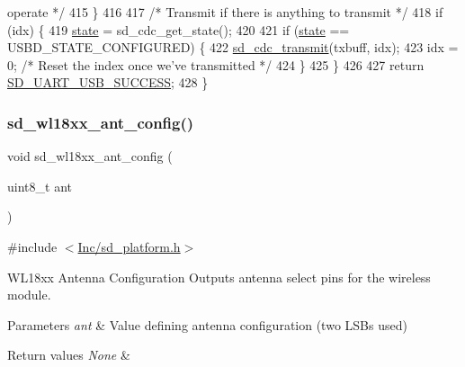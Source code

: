 \begin{DoxyCode}
{       operate */}
415     \}
416 
417     \textcolor{comment}{/* Transmit if there is anything to transmit */}
418     \textcolor{keywordflow}{if} (idx) \{
419         \mbox{\hyperlink{structsd__cbuf_aa88ff4ca3b7aaba9e9aaa27fd9ea94a9}{state}} = sd\_cdc\_get\_state();
420         
421         \textcolor{keywordflow}{if} (\mbox{\hyperlink{structsd__cbuf_aa88ff4ca3b7aaba9e9aaa27fd9ea94a9}{state}} == USBD\_STATE\_CONFIGURED) \{
422             \mbox{\hyperlink{group___s_d___u_s_b___c_d_c___i_f___functions_gabd3573e5083061a52edc3dcd98e6f827}{sd\_cdc\_transmit}}(txbuff, idx);
423             idx = 0;    \textcolor{comment}{/* Reset the index once we've transmitted */}
424         \}
425     \}
426 
427     \textcolor{keywordflow}{return} \mbox{\hyperlink{group___s_d___u_a_r_t___u_s_b___bridge___types_gga7e4773a8cce69fafe541cad55985f146a5f1ee74f25f6a6f1aa6b771dc91abe11}{SD\_UART\_USB\_SUCCESS}};
428 \}
\end{DoxyCode}
\mbox{\label{group___s_d___platform___function___declarations_ga3d09a16b4b68ce526bd3eddba77b655c}} 
\subsubsection{\texorpdfstring{sd\+\_\+wl18xx\+\_\+ant\+\_\+config()}{sd\_wl18xx\_ant\_config()}}
{\footnotesize\ttfamily void sd\+\_\+wl18xx\+\_\+ant\+\_\+config (\begin{DoxyParamCaption}\item[{uint8\+\_\+t}]{ant }\end{DoxyParamCaption})}



{\ttfamily \#include $<$\mbox{\hyperlink{sd__platform_8h}{Inc/sd\+\_\+platform.\+h}}$>$}



W\+L18xx Antenna Configuration Outputs antenna select pins for the wireless module. 


\begin{DoxyParams}{Parameters}
{\em ant} & Value defining antenna configuration (two L\+S\+Bs used) \\
\hline
\end{DoxyParams}

\begin{DoxyRetVals}{Return values}
{\em None} & \\
\hline
\end{DoxyRetVals}

